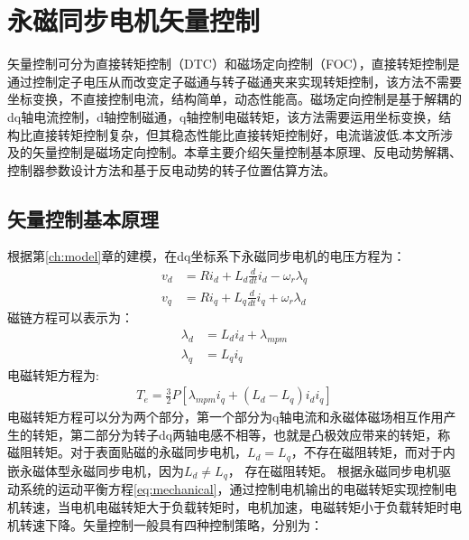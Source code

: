 \chapter{永磁同步电机矢量控制}\label{ch:FOC}
矢量控制可分为直接转矩控制（DTC）和磁场定向控制（FOC），直接转矩控制是通过控制定子电压从而改变定子磁通与转子磁通夹来实现转矩控制，该方法不需要坐标变换，不直接控制电流，结构简单，动态性能高。磁场定向控制是基于解耦的dq轴电流控制，d轴控制磁通，q轴控制电磁转矩，该方法需要运用坐标变换，结构比直接转矩控制复杂，但其稳态性能比直接转矩控制好，电流谐波低.本文所涉及的矢量控制是磁场定向控制。本章主要介绍矢量控制基本原理、反电动势解耦、控制器参数设计方法和基于反电动势的转子位置估算方法。

\section{矢量控制基本原理}
根据第\ref{ch:model}章的建模，在dq坐标系下永磁同步电机的电压方程为：
\begin{align}\label{eq:vdqFinal}
v_{d}&=Ri_{d}+L_{d}\frac{d}{dt}i_{d}-\omega_{r}\lambda_{q}\\
v_{q}&=Ri_{q}+L_{q}\frac{d}{dt}i_{q}+\omega_{r}\lambda_{d}\label{eq:vol_q}
\end{align}
磁链方程可以表示为：
\begin{align}
\lambda_{d}&=L_{d}i_{d}+\lambda_{mpm}\label{eq:flux_d}\\
\lambda_{q}&=L_{q}i_{q}
\end{align}
电磁转矩方程为:
\begin{align}
T_{e}=\frac{3}{2}P\left[\lambda_{mpm}i_{q}+(L_{d}-L_{q})i_{d}i_{q}\right]
\end{align}
电磁转矩方程可以分为两个部分，第一个部分为q轴电流和永磁体磁场相互作用产生的转矩，第二部分为转子dq两轴电感不相等，也就是凸极效应带来的转矩，称磁阻转矩。对于表面贴磁的永磁同步电机，$L_{d}=L_{q}$，不存在磁阻转矩，而对于内嵌永磁体型永磁同步电机，因为$L_{d}$$\neq$$L_{q}$， 存在磁阻转矩。
根据永磁同步电机驱动系统的运动平衡方程\ref{eq:mechanical}，通过控制电机输出的电磁转矩实现控制电机转速，当电机电磁转矩大于负载转矩时，电机加速，电磁转矩小于负载转矩时电机转速下降。矢量控制一般具有四种控制策略，分别为：
